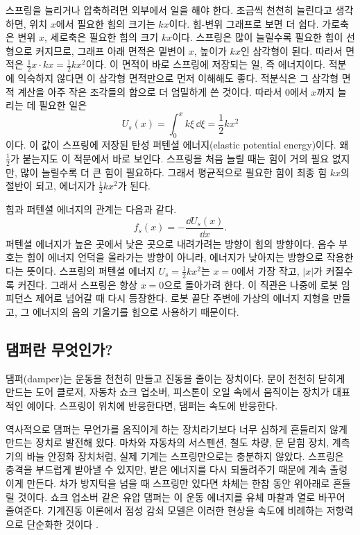 스프링을 늘리거나 압축하려면 외부에서 일을 해야 한다.
조금씩 천천히 늘린다고 생각하면, 위치 $x$에서 필요한 힘의 크기는 $kx$이다.
힘-변위 그래프로 보면 더 쉽다.
가로축은 변위 $x$, 세로축은 필요한 힘의 크기 $kx$이다.
스프링은 많이 늘릴수록 필요한 힘이 선형으로 커지므로, 그래프 아래 면적은 밑변이 $x$, 높이가 $kx$인 삼각형이 된다.
따라서 면적은 $\frac{1}{2}x\cdot kx=\frac{1}{2}kx^2$이다.
이 면적이 바로 스프링에 저장되는 일, 즉 에너지이다.
적분에 익숙하지 않다면 이 삼각형 면적만으로 먼저 이해해도 좋다.
적분식은 그 삼각형 면적 계산을 아주 작은 조각들의 합으로 더 엄밀하게 쓴 것이다.
따라서 0에서 $x$까지 늘리는 데 필요한 일은
\begin{equation}
  U_s(x)
  =
  \int_0^x k\xi\,\dd \xi
  =
  \frac{1}{2}kx^2
  \label{eq:spring_energy}
\end{equation}
이다.
이 값이 스프링에 저장된 탄성 퍼텐셜 에너지(elastic potential energy)이다.
왜 $\frac{1}{2}$가 붙는지도 이 적분에서 바로 보인다.
스프링을 처음 늘릴 때는 힘이 거의 필요 없지만, 많이 늘릴수록 더 큰 힘이 필요하다.
그래서 평균적으로 필요한 힘이 최종 힘 $kx$의 절반이 되고, 에너지가 $\frac{1}{2}kx^2$가 된다.

힘과 퍼텐셜 에너지의 관계는 다음과 같다.
\begin{equation}
  f_s(x)=-\frac{\dd U_s(x)}{\dd x}.
\end{equation}
퍼텐셜 에너지가 높은 곳에서 낮은 곳으로 내려가려는 방향이 힘의 방향이다.
음수 부호는 힘이 에너지 언덕을 올라가는 방향이 아니라, 에너지가 낮아지는 방향으로 작용한다는 뜻이다.
스프링의 퍼텐셜 에너지 $U_s=\frac{1}{2}kx^2$는 $x=0$에서 가장 작고, $|x|$가 커질수록 커진다.
그래서 스프링은 항상 $x=0$으로 돌아가려 한다.
이 직관은 나중에 로봇 임피던스 제어로 넘어갈 때 다시 등장한다.
로봇 끝단 주변에 가상의 에너지 지형을 만들고, 그 에너지의 음의 기울기를 힘으로 사용하기 때문이다.

\subsection{댐퍼란 무엇인가?}

댐퍼(damper)는 운동을 천천히 만들고 진동을 줄이는 장치이다.
문이 천천히 닫히게 만드는 도어 클로저, 자동차 쇼크 업소버, 피스톤이 오일 속에서 움직이는 장치가 대표적인 예이다.
스프링이 위치에 반응한다면, 댐퍼는 속도에 반응한다.

역사적으로 댐퍼는 무언가를 움직이게 하는 장치라기보다 너무 심하게 흔들리지 않게 만드는 장치로 발전해 왔다.
마차와 자동차의 서스펜션, 철도 차량, 문 닫힘 장치, 계측기의 바늘 안정화 장치처럼, 실제 기계는 스프링만으로는 충분하지 않았다.
스프링은 충격을 부드럽게 받아낼 수 있지만, 받은 에너지를 다시 되돌려주기 때문에 계속 출렁이게 만든다.
차가 방지턱을 넘을 때 스프링만 있다면 차체는 한참 동안 위아래로 흔들릴 것이다.
쇼크 업소버 같은 유압 댐퍼는 이 운동 에너지를 유체 마찰과 열로 바꾸어 줄여준다.
기계진동 이론에서 점성 감쇠 모델은 이러한 현상을 속도에 비례하는 저항력으로 단순화한 것이다 \cite{libretexts_viscous_damping}.

